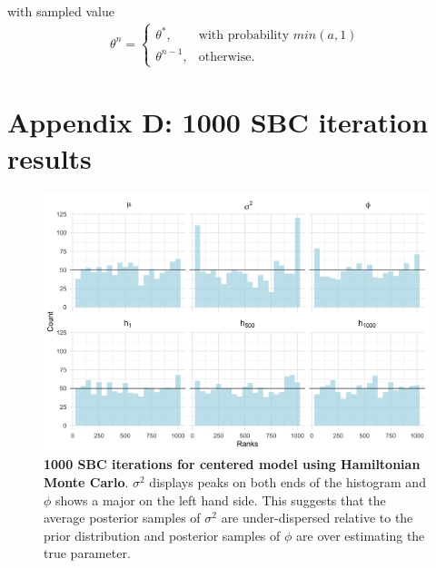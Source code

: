 \documentclass[12pt, a4paper]{article}
\begin{document}
with sampled value
\begin{align}
\theta^n = \begin{cases}
    \theta^{\ast},& \text{with probability } min(a,1)\\
    \theta^{n-1}, & \text{otherwise}.
    \end{cases}
\end{align}

\section{Appendix D: 1000 SBC iteration results}

    \begin{figure}[H]
        \centering
        \includegraphics[scale=0.09]{results/hmc_cp_1k.png}
        \caption{\textbf{1000 SBC iterations for centered model using Hamiltonian Monte Carlo}. $\sigma^2$ displays peaks on both ends of the histogram and $\phi$ shows a major on the left hand side. This suggests that the average posterior samples of $\sigma^2$ are under-dispersed relative to the prior distribution and posterior samples of $\phi$ are over estimating the true parameter.}
        \label{fig:cphmc1k}
    \end{figure} 
\end{document}
